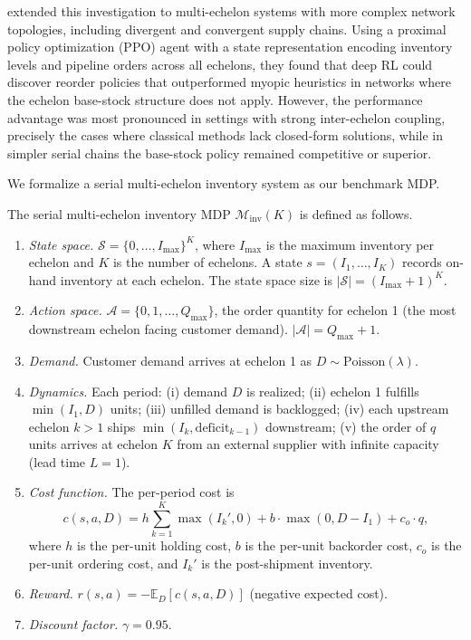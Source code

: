\citet{vanHezewijk2023inventory} extended this investigation to multi-echelon systems with more complex network topologies, including divergent and convergent supply chains. Using a proximal policy optimization (PPO) agent with a state representation encoding inventory levels and pipeline orders across all echelons, they found that deep RL could discover reorder policies that outperformed myopic heuristics in networks where the echelon base-stock structure does not apply. However, the performance advantage was most pronounced in settings with strong inter-echelon coupling, precisely the cases where classical methods lack closed-form solutions, while in simpler serial chains the base-stock policy remained competitive or superior.

We formalize a serial multi-echelon inventory system as our benchmark MDP.

\begin{definition}
\label{def:inventory_mdp}
The serial multi-echelon inventory MDP $\mathcal{M}_{\mathrm{inv}}(K)$ is defined as follows.
\begin{enumerate}
    \item \emph{State space.} $\mathcal{S} = \{0, \ldots, I_{\max}\}^K$, where $I_{\max}$ is the maximum inventory per echelon and $K$ is the number of echelons. A state $s = (I_1, \ldots, I_K)$ records on-hand inventory at each echelon. The state space size is $|\mathcal{S}| = (I_{\max} + 1)^K$.
    \item \emph{Action space.} $\mathcal{A} = \{0, 1, \ldots, Q_{\max}\}$, the order quantity for echelon 1 (the most downstream echelon facing customer demand). $|\mathcal{A}| = Q_{\max} + 1$.
    \item \emph{Demand.} Customer demand arrives at echelon 1 as $D \sim \mathrm{Poisson}(\lambda)$.
    \item \emph{Dynamics.} Each period: (i) demand $D$ is realized; (ii) echelon 1 fulfills $\min(I_1, D)$ units; (iii) unfilled demand is backlogged; (iv) each upstream echelon $k > 1$ ships $\min(I_k, \text{deficit}_{k-1})$ downstream; (v) the order of $q$ units arrives at echelon $K$ from an external supplier with infinite capacity (lead time $L = 1$).
    \item \emph{Cost function.} The per-period cost is
    \begin{equation}
    \label{eq:inventory_cost}
    c(s, a, D) = h \sum_{k=1}^{K} \max(I_k', 0) + b \cdot \max(0, D - I_1) + c_o \cdot q,
    \end{equation}
    where $h$ is the per-unit holding cost, $b$ is the per-unit backorder cost, $c_o$ is the per-unit ordering cost, and $I_k'$ is the post-shipment inventory.
    \item \emph{Reward.} $r(s, a) = -\mathbb{E}_D[c(s, a, D)]$ (negative expected cost).
    \item \emph{Discount factor.} $\gamma = 0.95$.
\end{enumerate}
\end{definition}

